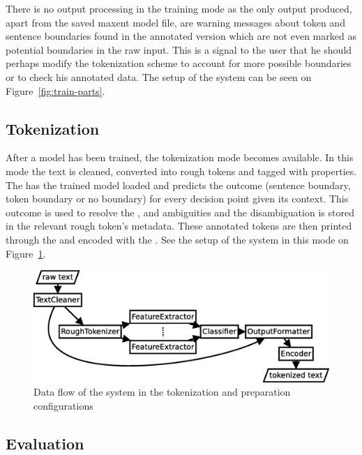 There is no output processing in the training mode as the only output produced,
apart from the saved maxent model file, are warning messages about token and
sentence boundaries found in the annotated version which are not even marked as
potential boundaries in the raw input. This is a signal to the user that he
should perhaps modify the tokenization scheme to account for more possible
boundaries or to check his annotated data. The setup of the system can be seen
on Figure~\ref{fig:train-parts}.

\subsection{Tokenization}
\label{ssec:impl-modes-tokenize}

After a model has been trained, the tokenization mode becomes available. In
this mode the text is cleaned, converted into rough tokens and tagged with
properties. The  has the trained model loaded and predicts
the outcome (sentence boundary, token boundary or no boundary) for every
decision point given its context. This outcome is used to resolve the
\maysplit{}, \mayjoin{} and \maybreaksentence{} ambiguities and the
disambiguation is stored in the relevant rough token's metadata. These
annotated tokens are then printed through the  and
encoded with the . See the setup of the system in this mode on
Figure~\ref{fig:tokenize-parts}.

\begin{figure}
  \begin{center}
    \includegraphics[width=\textwidth]{img/tokenize-parts.eps}
    \caption{Data flow of the system in the tokenization and preparation
             configurations}
    \label{fig:tokenize-parts}
  \end{center}
\end{figure}

\subsection{Evaluation}
\label{ssec:impl-modes-evaluate}

